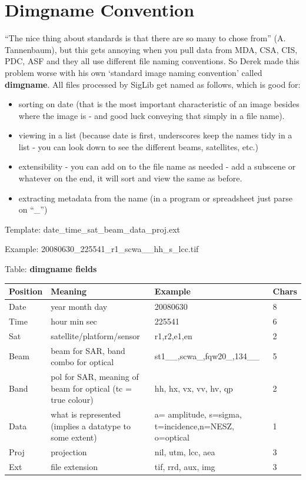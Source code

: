 \documentclass[letterpaper,10pt,openany,oneside]{sphinxmanual}
\begin{document}
\section{Dimgname Convention}
\label{project:dimgname-convention}
“The nice thing about standards is that there are so many to chose from”
(A. Tannenbaum), but this gets annoying when you pull data from MDA,
CSA, CIS, PDC, ASF and they all use different file naming conventions.
So Derek made this problem worse with his own `standard image naming
convention' called \textbf{dimgname}. All files
processed by SigLib get named as follows, which is good for:
\begin{itemize}
\item {} 
sorting on date (that is the most important characteristic of an
image besides where the image is - and good luck conveying that
simply in a file name).

\item {} 
viewing in a list (because date is first, underscores keep the names
tidy in a list - you can look down to see the different beams,
satellites, etc.)

\item {} 
extensibility - you can add on to the file name as needed - add a
subscene or whatever on the end, it will sort and view the same as
before.

\item {} 
extracting metadata from the name (in a program or spreadsheet just
parse on ``\_'')

\end{itemize}

Template: date\_time\_sat\_beam\_data\_proj.ext

Example: 20080630\_225541\_r1\_scwa\_\_hh\_s\_lcc.tif

Table: \textbf{dimgname fields}

\begin{tabulary}{\linewidth}{|L|L|L|L|}
\hline
\textsf{\relax 
Position
} & \textsf{\relax 
Meaning
} & \textsf{\relax 
Example
} & \textsf{\relax 
Chars
}\\
\hline
Date
 & 
year month day
 & 
20080630
 & 
8
\\
\hline
Time
 & 
hour min sec
 & 
225541
 & 
6
\\
\hline
Sat
 & 
satellite/platform/sensor
 & 
r1,r2,e1,en
 & 
2
\\
\hline
Beam
 & 
beam for SAR, band combo for optical
 & 
st1\_\_,scwa\_,fqw20\_,134\_\_
 & 
5
\\
\hline
Band
 & 
pol for SAR, meaning of beam for optical (tc = true colour)
 & 
hh, hx, vx, vv, hv, qp
 & 
2
\\
\hline
Data
 & 
what is represented (implies a datatype to some extent)
 & 
a= amplitude, s=sigma, t=incidence,n=NESZ, o=optical
 & 
1
\\
\hline
Proj
 & 
projection
 & 
nil, utm, lcc, aea
 & 
3
\\
\hline
Ext
 & 
file extension
 & 
tif, rrd, aux, img
 & 
3
\\
\hline\end{tabulary}
\end{document}
